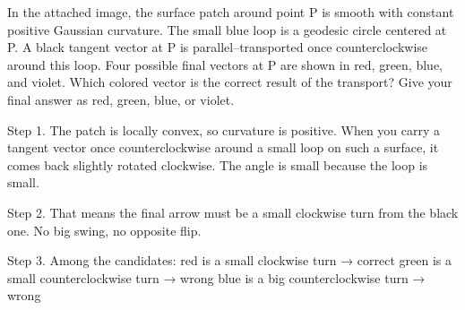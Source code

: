 In the attached image, the surface patch around point P is smooth with constant positive Gaussian curvature. The small blue loop is a geodesic circle centered at P. A black tangent vector at P is parallel–transported once counterclockwise around this loop. Four possible final vectors at P are shown in red, green, blue, and violet. Which colored vector is the correct result of the transport? Give your final answer as red, green, blue, or violet.


Step 1. The patch is locally convex, so curvature is positive. When you carry a tangent vector once counterclockwise around a small loop on such a surface, it comes back slightly rotated clockwise. The angle is small because the loop is small.

Step 2. That means the final arrow must be a small clockwise turn from the black one. No big swing, no opposite flip.

Step 3. Among the candidates:
red is a small clockwise turn → correct
green is a small counterclockwise turn → wrong
blue is a big counterclockwise turn → wrong